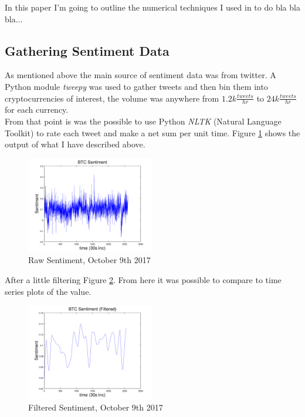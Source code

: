 \documentclass[12pt,journal,compsoc]{IEEEtran}
\begin{document}
In this paper I'm going to outline the numerical techniques I used in to do bla bla bla...

\subsection{Gathering Sentiment Data}
As mentioned above the main source of sentiment data was from twitter. A Python module \textit{tweepy} was used to gather
tweets and then bin them into cryptocurrencies of interest, the volume was anywhere from $1.2k \frac{tweets}{hr}$
to  $24k \frac{tweets}{hr}$ for each currency.\\

From that point is was the possible to use Python \textit{NLTK} (Natural Language Toolkit) to rate each tweet and make a net
sum per unit time. Figure \ref{fig:RawSent} shows the output of what I have described above.

\begin{figure}[hp]
	\centering
	\includegraphics[width=0.5\textwidth]{../Datasets/Plots/Oct9_Sen}
	\caption{Raw Sentiment, October 9th 2017}
	\label{fig:RawSent}
\end{figure}

After a little filtering Figure \ref{fig:FilteredSent}. From here it was possible to compare to time series plots of the
value.

\begin{figure}[h]
	\centering
	\includegraphics[width=0.5\textwidth]{../Datasets/Plots/Oct9_Sen_Fil}
	\caption{Filtered Sentiment, October 9th 2017}
	\label{fig:FilteredSent}
\end{figure}
\end{document}
